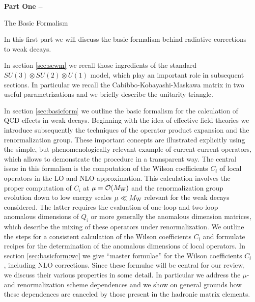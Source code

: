 \skipevenpage

{\Huge\bf
\noindent
Part One --

\bigskip
\bigskip
\bigskip

\noindent
The Basic Formalism
}

\vfil

\noindent
In this first part we will discuss the basic formalism behind radiative
corrections to weak decays.

In section \ref{sec:sewm} we recall those ingredients of the standard
$SU(3)\otimes SU(2)\otimes  U(1)$ model, which play an important role
in subsequent sections. In particular we recall the
Cabibbo-Kobayashi-Maskawa matrix in two useful parametrizations and we
briefly describe the unitarity triangle.

In section \ref{sec:basicform} we outline the basic formalism for the
calculation of QCD effects in weak decays.  Beginning with the idea of
effective field theories we introduce subsequently the techniques of
the operator product expansion and the renormalization group. These
important concepts are illustrated explicitly using the simple, but
phenomenologically relevant example of current-current operators, which
allows to demonstrate the procedure in a transparent way. The central
issue in this formalism is the computation of the Wilson coefficients
$C_i$ of local operators in the LO and NLO approximation. This
calculation involves the proper computation of $C_i$ at $\mu =
{\cal O}(M_{\rm W})$ and the renormalization group evolution down to low energy
scales $\mu\ll M_{\rm W}$ relevant for the weak decays considered. The latter
requires the evaluation of one-loop and two-loop anomalous dimensions
of $Q_i$ or more generally the anomalous dimension matrices, which
describe the mixing of these operators under renormalization.  We
outline the steps for a consistent calculation of the Wilson
coefficients $C_i$ and formulate recipes for the determination of the
anomalous dimensions of local operators.  In section
\ref{sec:basicform:wc} we give ``master formulae'' for the Wilson
coefficients $C_i$ , including NLO corrections.  Since these formulae
will be central for our review, we discuss their various properties in
some detail. In particular we address the $\mu$- and renormalization
scheme dependences and we show on general grounds how these dependences
are canceled by those present in the hadronic matrix elements.
